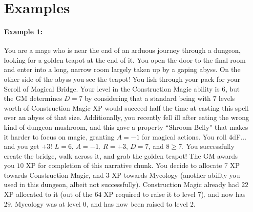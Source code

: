 \section{Examples}

\paragraph{Example 1:}
You are a mage who is near the end of an arduous journey through a dungeon, looking for a golden teapot at the end of it.
You open the door to the final room and enter into a long, narrow room largely taken up by a gaping abyss.
On the other side of the abyss you see the teapot!
You fish through your pack for your Scroll of Magical Bridge.
Your level in the Construction Magic ability is $6$,
but the GM determines
$D = 7$
by considering that a standard being with $7$ levels worth of Construction Magic XP would succeed half the time at casting this spell over an abyss of that size.
Additionally, you recently fell ill after eating the wrong kind of dungeon mushroom,
and this gave a property ``Shroom Belly'' that makes it harder to focus on magic,
granting $A = -1$ for magical actions.
You roll $4$dF... and you get $+3$!
$L = 6$, $A = -1$, $R = +3$, $D = 7$, and $8 \geq 7$.
You successfully create the bridge, walk across it, and grab the golden teapot!
The GM awards you $10$ XP for completion of this narrative chunk.
You decide to allocate $7$ XP towards Construction Magic, and $3$ XP towards Mycology (another ability you used in this dungeon, albeit not successfully).
Construction Magic already had $22$ XP allocated to it (out of the $64$ XP required to raise it to level $7$), and now has $29$.
Mycology was at level $0$, and has now been raised to level $2$.

